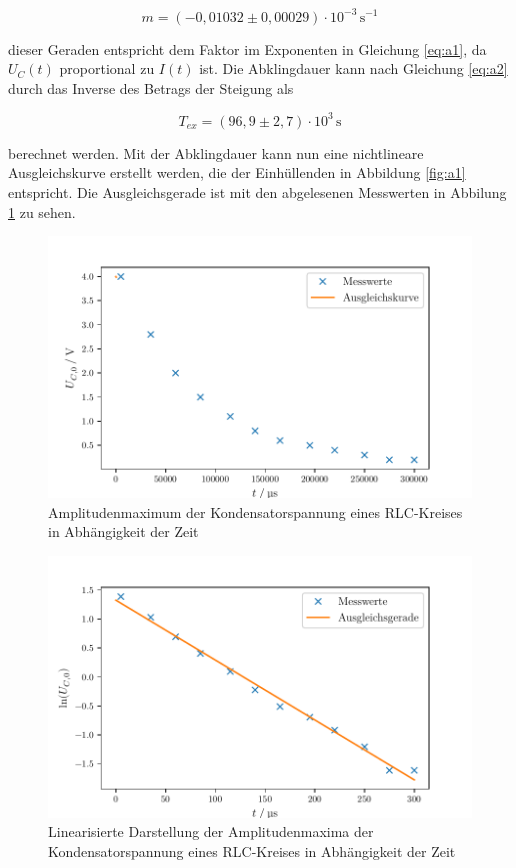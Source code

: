 \begin{equation*}
  m=(-0,01032\pm0,00029)\cdot 10^{-3}\,\si{\second}^{-1}
\end{equation*}

\noindent dieser Geraden entspricht dem Faktor im Exponenten in Gleichung \ref{eq:a1},
da $U_C(t)$ proportional zu $I(t)$ ist. Die Abklingdauer
kann nach Gleichung \ref{eq:a2} durch das 
Inverse des Betrags der Steigung als 

\begin{equation*}
  T_{ex}=(96,9\pm2,7)\cdot10^{3}\,\si{\second}
\end{equation*}

\noindent berechnet werden. Mit der Abklingdauer kann nun eine nichtlineare Ausgleichskurve
erstellt werden, die der Einhüllenden in Abbildung \ref{fig:a1}
entspricht. Die Ausgleichsgerade ist mit den abgelesenen
Messwerten in Abbilung \ref{fig:a} zu sehen.

\begin{figure}[H]
  \centering
  \includegraphics{build/plot1.pdf}
  \caption{Amplitudenmaximum der Kondensatorspannung eines RLC-Kreises in Abhängigkeit der Zeit}
  \label{fig:a}
\end{figure}

\begin{figure}[H]
  \centering
  \includegraphics{build/plot1-1.pdf}
  \caption{Linearisierte Darstellung der Amplitudenmaxima der Kondensatorspannung eines RLC-Kreises in Abhängigkeit der Zeit}
  \label{fig:b}
\end{figure}

